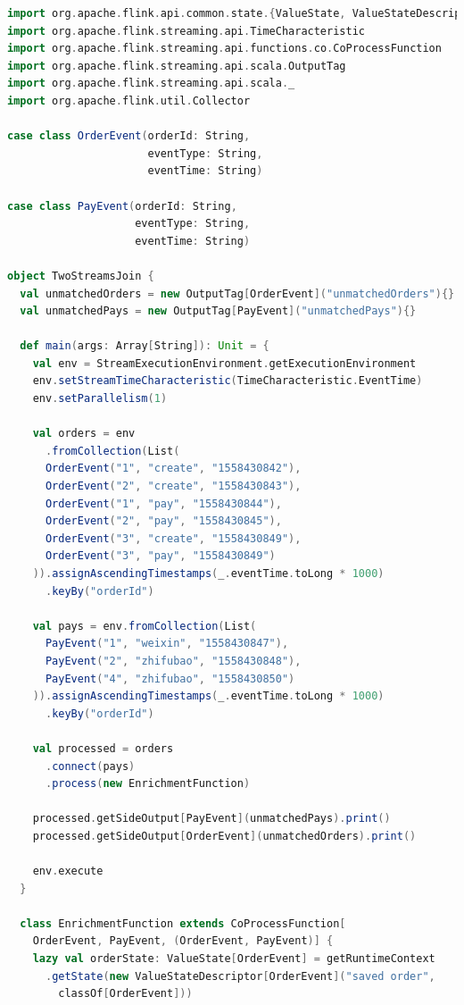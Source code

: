 \documentclass[oneside]{ctexbook}
\begin{document}
\begin{lstlisting}[language=scala]
import org.apache.flink.api.common.state.{ValueState, ValueStateDescriptor}
import org.apache.flink.streaming.api.TimeCharacteristic
import org.apache.flink.streaming.api.functions.co.CoProcessFunction
import org.apache.flink.streaming.api.scala.OutputTag
import org.apache.flink.streaming.api.scala._
import org.apache.flink.util.Collector

case class OrderEvent(orderId: String,
                      eventType: String,
                      eventTime: String)

case class PayEvent(orderId: String,
                    eventType: String,
                    eventTime: String)

object TwoStreamsJoin {
  val unmatchedOrders = new OutputTag[OrderEvent]("unmatchedOrders"){}
  val unmatchedPays = new OutputTag[PayEvent]("unmatchedPays"){}

  def main(args: Array[String]): Unit = {
    val env = StreamExecutionEnvironment.getExecutionEnvironment
    env.setStreamTimeCharacteristic(TimeCharacteristic.EventTime)
    env.setParallelism(1)

    val orders = env
      .fromCollection(List(
      OrderEvent("1", "create", "1558430842"),
      OrderEvent("2", "create", "1558430843"),
      OrderEvent("1", "pay", "1558430844"),
      OrderEvent("2", "pay", "1558430845"),
      OrderEvent("3", "create", "1558430849"),
      OrderEvent("3", "pay", "1558430849")
    )).assignAscendingTimestamps(_.eventTime.toLong * 1000)
      .keyBy("orderId")

    val pays = env.fromCollection(List(
      PayEvent("1", "weixin", "1558430847"),
      PayEvent("2", "zhifubao", "1558430848"),
      PayEvent("4", "zhifubao", "1558430850")
    )).assignAscendingTimestamps(_.eventTime.toLong * 1000)
      .keyBy("orderId")

    val processed = orders
      .connect(pays)
      .process(new EnrichmentFunction)

    processed.getSideOutput[PayEvent](unmatchedPays).print()
    processed.getSideOutput[OrderEvent](unmatchedOrders).print()

    env.execute
  }

  class EnrichmentFunction extends CoProcessFunction[
    OrderEvent, PayEvent, (OrderEvent, PayEvent)] {
    lazy val orderState: ValueState[OrderEvent] = getRuntimeContext
      .getState(new ValueStateDescriptor[OrderEvent]("saved order",
        classOf[OrderEvent]))


\end{lstlisting}
\end{document}
